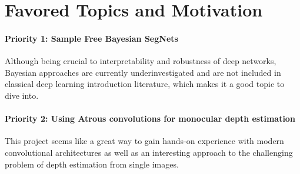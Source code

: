 \documentclass[11pt,english]{article}
\begin{document}
\section{Favored Topics and Motivation}
\paragraph{Priority 1: Sample Free Bayesian SegNets} Although being crucial to interpretability and robustness of deep networks, Bayesian approaches are currently underinvestigated and are not included in classical deep learning introduction literature, which makes it a good topic to dive into.
\paragraph{Priority 2: Using Atrous convolutions for monocular depth estimation} This project seems like a great way to gain hands-on experience with modern convolutional architectures as well as an interesting approach to the challenging problem of depth estimation from single images.



\end{document}
